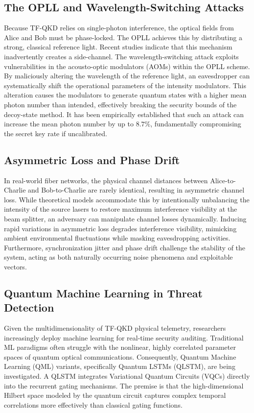 \documentclass[conference]{IEEEtran}
\begin{document}
\subsection{The OPLL and Wavelength-Switching Attacks}
Because TF-QKD relies on single-photon interference, the optical fields from Alice and Bob must be phase-locked. The OPLL achieves this by distributing a strong, classical reference light. Recent studies indicate that this mechanism inadvertently creates a side-channel. The wavelength-switching attack exploits vulnerabilities in the acousto-optic modulators (AOMs) within the OPLL scheme. By maliciously altering the wavelength of the reference light, an eavesdropper can systematically shift the operational parameters of the intensity modulators. This alteration causes the modulators to generate quantum states with a higher mean photon number than intended, effectively breaking the security bounds of the decoy-state method. It has been empirically established that such an attack can increase the mean photon number by up to $8.7\%$, fundamentally compromising the secret key rate if uncalibrated.

\subsection{Asymmetric Loss and Phase Drift}
In real-world fiber networks, the physical channel distances between Alice-to-Charlie and Bob-to-Charlie are rarely identical, resulting in asymmetric channel loss. While theoretical models accommodate this by intentionally unbalancing the intensity of the source lasers to restore maximum interference visibility at the beam splitter, an adversary can manipulate channel losses dynamically. Inducing rapid variations in asymmetric loss degrades interference visibility, mimicking ambient environmental fluctuations while masking eavesdropping activities. Furthermore, synchronization jitter and phase drift challenge the stability of the system, acting as both naturally occurring noise phenomena and exploitable vectors.

\subsection{Quantum Machine Learning in Threat Detection}
Given the multidimensionality of TF-QKD physical telemetry, researchers increasingly deploy machine learning for real-time security auditing. Traditional ML paradigms often struggle with the nonlinear, highly correlated parameter spaces of quantum optical communications. Consequently, Quantum Machine Learning (QML) variants, specifically Quantum LSTMs (QLSTM), are being investigated. A QLSTM integrates Variational Quantum Circuits (VQCs) directly into the recurrent gating mechanisms. The premise is that the high-dimensional Hilbert space modeled by the quantum circuit captures complex temporal correlations more effectively than classical gating functions.
\end{document}
